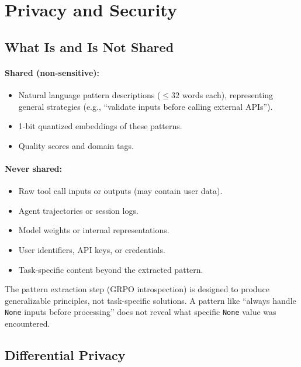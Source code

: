 \section{Privacy and Security}

\label{sec:privacy}

\subsection{What Is and Is Not Shared}

\paragraph{Shared (non-sensitive):}
\begin{itemize}[leftmargin=1.5em]
    \item Natural language pattern descriptions ($\leq 32$ words each),
          representing general strategies (e.g., ``validate inputs before
          calling external APIs'').
    \item 1-bit quantized embeddings of these patterns.
    \item Quality scores and domain tags.
\end{itemize}

\paragraph{Never shared:}
\begin{itemize}[leftmargin=1.5em]
    \item Raw tool call inputs or outputs (may contain user data).
    \item Agent trajectories or session logs.
    \item Model weights or internal representations.
    \item User identifiers, API keys, or credentials.
    \item Task-specific content beyond the extracted pattern.
\end{itemize}

The pattern extraction step (GRPO introspection) is designed to produce
generalizable principles, not task-specific solutions. A pattern like
``always handle \texttt{None} inputs before processing'' does not reveal
what specific \texttt{None} value was encountered.

\subsection{Differential Privacy}

